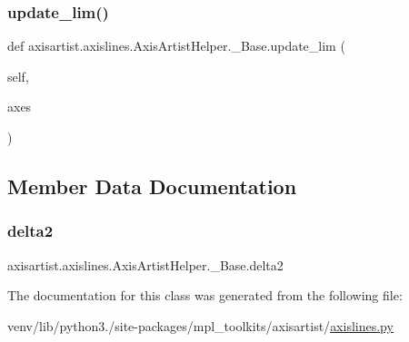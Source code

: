 \subsubsection{\texorpdfstring{update\+\_\+lim()}{update\_lim()}}
{\footnotesize\ttfamily def axisartist.\+axislines.\+Axis\+Artist\+Helper.\+\_\+\+Base.\+update\+\_\+lim (\begin{DoxyParamCaption}\item[{}]{self,  }\item[{}]{axes }\end{DoxyParamCaption})}



\subsection{Member Data Documentation}
\mbox{\label{classaxisartist_1_1axislines_1_1AxisArtistHelper_1_1__Base_a0d5b22b46b259fe4018efb12bdaba68b}} 
\subsubsection{\texorpdfstring{delta2}{delta2}}
{\footnotesize\ttfamily axisartist.\+axislines.\+Axis\+Artist\+Helper.\+\_\+\+Base.\+delta2}



The documentation for this class was generated from the following file\+:\begin{DoxyCompactItemize}
\item 
venv/lib/python3./site-\/packages/mpl\+\_\+toolkits/axisartist/\hyperlink{axisartist_2axislines_8py}{axislines.\+py}\end{DoxyCompactItemize}

